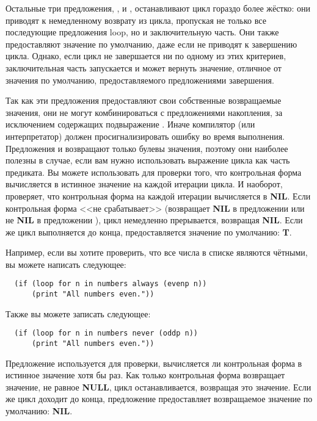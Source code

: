 Остальные три предложения, ,  и , останавливают
цикл гораздо более жёстко: они приводят к немедленному возврату из цикла, пропуская не
только все последующие предложения loop, но и заключительную часть. Они также
предоставляют значение по умолчанию, даже если не приводят к завершению цикла. Однако, если
цикл не завершается ни по одному из этих критериев, заключительная часть запускается и
может вернуть значение, отличное от значения по умолчанию, предоставляемого предложениями
завершения.

Так как эти предложения предоставляют свои собственные возвращаемые значения, они не могут
комбинироваться с предложениями накопления, за исключением содержащих подвыражение
. Иначе компилятор (или интерпретатор) должен просигнализировать ошибку во
время выполнения. Предложения  и  возвращают только булевы
значения, поэтому они наиболее полезны в случае, если вам нужно использовать выражение
цикла как часть предиката. Вы можете использовать  для проверки того, что
контрольная форма вычисляется в истинное значение на каждой итерации цикла. И наоборот,
 проверяет, что контрольная форма на каждой итерации вычисляется в
\textbf{NIL}. Если контрольная форма <<не срабатывает>> (возвращает \textbf{NIL} в
предложении  или не \textbf{NIL} в предложении ), цикл немедленно
прерывается, возвращая \textbf{NIL}. Если же цикл выполняется до конца, предоставляется
значение по умолчанию: \textbf{T}.

Например, если вы хотите проверить, что все числа в списке  являются
чётными, вы можете написать следующее:

\begin{lstlisting}
  (if (loop for n in numbers always (evenp n))
      (print "All numbers even."))
\end{lstlisting}

Также вы можете записать следующее:

\begin{lstlisting}
  (if (loop for n in numbers never (oddp n))
      (print "All numbers even."))
\end{lstlisting}

Предложение  используется для проверки, вычисляется ли контрольная форма в
истинное значение хотя бы раз. Как только контрольная форма возвращает значение, не равное
\textbf{NULL}, цикл останавливается, возвращая это значение. Если же цикл доходит до
конца, предложение  предоставляет возвращаемое значение по умолчанию:
\textbf{NIL}.

